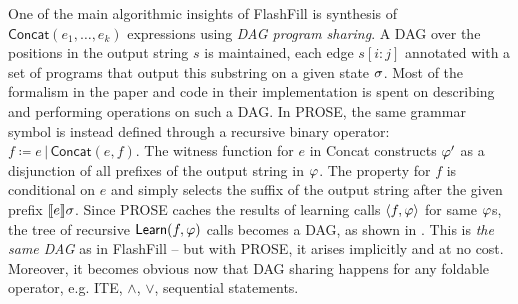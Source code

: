 \begin{scenario}
    One of the main algorithmic insights of FlashFill is synthesis of $\mathsf{Concat}(e_1, \dots, e_k)$ expressions
    using \emph{DAG program sharing}.
    A DAG over the positions in the output string $s$ is maintained, each edge $s[i:j]$ annotated with a
    set of programs that output this substring on a given state $\sigma$.
    Most of the formalism in the paper and code in their implementation is spent on describing and performing operations
    on such a DAG.
    In PROSE, the same grammar symbol is instead defined through a recursive binary operator: $f \coloneq e \,|\,
    \mathsf{Concat}(e, f)$.
    The witness function for $e$ in \textsf{Concat} constructs $\varphi'$ as a disjunction of all prefixes of
    the output string in $\varphi$.
    The property for $f$ is conditional on $e$ and simply selects the suffix of the output string after the given prefix
    $\llbracket e \rrbracket{\ensuremath{\sigma}}$.
    Since PROSE caches the results of learning calls $\langle f, \varphi \rangle$ for same $\varphi$s, the tree of
    recursive $\mathsf{Learn}(f, \varphi)$ calls becomes a DAG, as shown in .
    This is \emph{the same DAG} as in FlashFill -- but with PROSE, it arises implicitly and at no cost.
    Moreover, it becomes obvious now that DAG sharing happens for any foldable operator, e.g. \textsf{ITE}, $\wedge$,
    $\vee$, sequential statements.
    \label{sc:dag}
\end{scenario}

